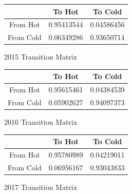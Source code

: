 \documentclass[letterpaper,12pt]{article}\usepackage[]{graphicx}\usepackage[]{color}
\begin{document}
{\tiny
\begin{center}
\end{center}
}

\begin{figure}
\begin{center}
\begin{tabular}{ |c| c| c| }
\hline
 & To Hot  & To Cold \\ 
 \hline
From Hot & 0.95413544 & 0.04586456 \\  
\hline
From Cold & 0.06349286 & 0.93650714    \\
\hline
\end{tabular}
\end{center}
\caption{2015 Transition Matrix}
\end{figure}

\begin{figure}
\begin{center}
\begin{tabular}{ |c| c| c| }
\hline
 & To Hot  & To Cold \\ 
 \hline
From Hot &0.95615461 &  0.04384539  \\  
\hline
From Cold &0.05902627 &  0.94097373   \\
\hline
\end{tabular}
\end{center}
\caption{2016 Transition Matrix}
\end{figure}

\begin{figure}
\begin{center}
\begin{tabular}{ |c| c| c| }
\hline
 & To Hot  & To Cold \\ 
 \hline
From Hot &0.95780989 & 0.04219011  \\  
\hline
From Cold &0.06956167 & 0.93043833   \\
\hline
\end{tabular}
\end{center}
\caption{2017 Transition Matrix}
\end{figure}
\end{document}
